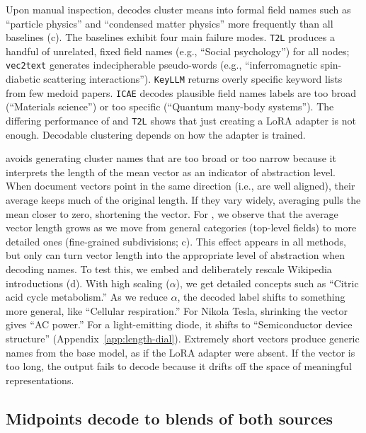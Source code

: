 
Upon manual inspection, \doctolora decodes cluster means into formal field names such as ``particle physics'' and ``condensed matter physics'' more frequently than all baselines (c).
The baselines exhibit four main failure modes.
\texttt{T2L} produces a handful of unrelated, fixed field names (e.g., ``Social psychology'') for all nodes; \texttt{vec2text} generates indecipherable pseudo-words (e.g., ``inferromagnetic spin-diabetic scattering interactions''). \texttt{KeyLLM} returns overly specific keyword lists from few medoid papers. \texttt{ICAE} decodes plausible field names labels are too broad (``Materials science'') or too specific (``Quantum many-body systems''). 
The differing performance of \doctolora and \texttt{T2L} shows that just creating a LoRA adapter is not enough. 
Decodable clustering depends on how the adapter is trained.

\doctolora avoids generating cluster names that are too broad or too narrow because it interprets the length of the mean vector as an indicator of abstraction level. 
When document vectors point in the same direction (i.e., are well aligned), their average keeps much of the original length. 
If they vary widely, averaging pulls the mean closer to zero, shortening the vector. For \doctolora, we observe that the average vector length grows as we move from general categories (top-level fields) to more detailed ones (fine-grained subdivisions; c).
This effect appears in all methods, but only \doctolora can turn vector length into the appropriate level of abstraction when decoding names. 
To test this, we embed and deliberately rescale Wikipedia introductions (d). 
With high scaling ($\alpha$), we get detailed concepts such as ``Citric acid cycle metabolism.'' 
As we reduce $\alpha$, the decoded label shifts to something more general, like ``Cellular respiration.'' 
For Nikola Tesla, shrinking the vector gives ``AC power.'' For a light-emitting diode, it shifts to ``Semiconductor device structure'' (Appendix~\ref{app:length-dial}). 
Extremely short vectors produce generic names from the base model, as if the LoRA adapter were absent. 
If the vector is too long, the output fails to decode because it drifts off the space of meaningful representations.

\subsection{Midpoints decode to blends of both sources}
\label{sec:fusion}

